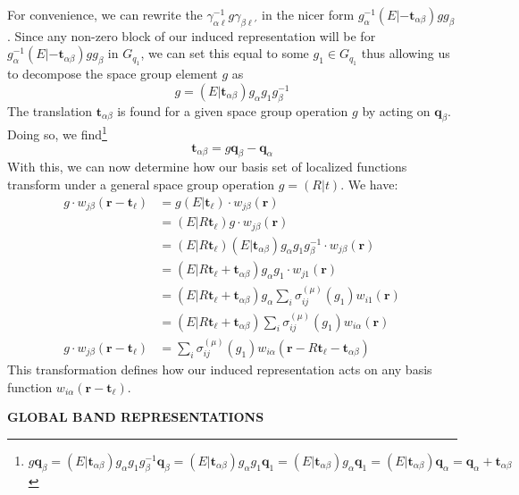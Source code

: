 \documentclass[9 pt]{report}
\def\*#1{\boldsymbol{#1}}
\begin{document}
For convenience, we can rewrite the $\gamma_{\alpha\ell}^{-1}g\gamma_{\beta\ell'}$ in the nicer form $g_\alpha^{-1}(E|-\*t_{\alpha\beta})gg_{\beta}$. Since any non-zero block of our induced representation will be for $g_{\alpha}^{-1}(E|-\*t_{\alpha\beta})gg_\beta$ in $G_{q_1}$, we can set this equal to some $g_1\in G_{q_1}$ thus allowing us to decompose the space group element $g$ as
$$ g = (E|\*t_{\alpha\beta})g_\alpha g_1 g_\beta^{-1} $$
The translation $\*t_{\alpha\beta}$ is found for a given space group operation $g$ by acting on $\*q_\beta$. Doing so, we find\footnote{$ g\*q_\beta = (E|\*t_{\alpha\beta})g_\alpha g_1 g_\beta^{-1}\*q_\beta = (E|\*t_{\alpha\beta})g_\alpha g_1 \*q_1 = (E|\*t_{\alpha\beta})g_\alpha \*q_1 = (E|\*t_{\alpha\beta})\*q_\alpha = \*q_\alpha + \*t_{\alpha\beta} $}
$$ \*t_{\alpha\beta} = g\*q_\beta - \*q_\alpha $$
With this, we can now determine how our basis set of localized functions transform under a general space group operation $g=(R|t)$. We have:
\begin{align*}
g\cdot w_{j\beta}(\*r - \*t_\ell) &= g(E|\*t_\ell)\cdot w_{j\beta}(\*r) \\
&=(E|R\*t_\ell)g\cdot w_{j\beta}(\*r)\\
&= (E|R\*t_\ell)(E|\*t_{\alpha\beta})g_\alpha g_1 g_\beta^{-1}\cdot w_{j\beta}(\*r) \\
&= (E|R\*t_\ell + \*t_{\alpha\beta})g_\alpha g_1 \cdot w_{j1}(\*r)\\
&= (E|R\*t_\ell + \*t_{\alpha\beta})g_\alpha \sum_i\sigma^{(\mu)}_{ij}(g_1) w_{i1}(\*r)\\
&= (E|R\*t_\ell + \*t_{\alpha\beta}) \sum_i\sigma^{(\mu)}_{ij}(g_1) w_{i\alpha}(\*r) \\
g\cdot w_{j\beta}(\*r-\*t_\ell)&= \sum_i\sigma^{(\mu)}_{ij}(g_1) w_{i\alpha}(\*r - R\*t_\ell - \*t_{\alpha\beta})
\end{align*}
This transformation defines how our induced representation acts on any basis function $w_{i\alpha}(\*r-\*t_\ell)$.
\\

\begin{center}
	\textbf{GLOBAL BAND REPRESENTATIONS}
\end{center}
\end{document}
